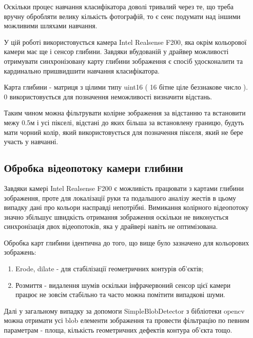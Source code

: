 Оскільки процес навчання класифікатора доволі тривалий через те, що треба вручну обробляти велику кількість фотографій, то є сенс подумати над іншими можливими шляхами навчання.

У цій роботі використовується камера Intel Realsense F200, яка окрім кольорової камери має ще і сенсор глибини. Завдяки вбудованій у драйвер можливості отримувати синхронізовану карту глибини зображення є спосіб удосконалити та кардинально пришвидшити навчання класифікатора.

Карта глибини - матриця з цілими типу uint16 ( 16 бітне ціле беззнакове число ). 0 використовується для позначення неможливості визначити відстань.

Таким чином можна фільтрувати колірне зображення за відстанню та встановити межу 0.5м і усі пікселі, відстані до яких більша за встановлену границю, будуть мати чорний колір, який використовується для позначення пікселя, який не бере участь у навчанні.

\subsection{Обробка відеопотоку камери глибини}
Завдяки камері Intel Realsense F200 є можливість працювати з картами глибини зображення, проте для локалізації руки та подальшого аналізу жестів в цьому випадку дані про кольори насправді непотрібні. Вимикання колірного відеопотоку значно збільшує швидкість отримання зображення оскільки не виконується синхронізація двох відеопотоків, яка у драйвері навіть не оптимізована.

Обробка карт глибини ідентична до того, що вище було зазначено для кольорових зображень:
\begin{enumerate}
	\item Erode, dilate - для стабілізації геометричних контурів об'єктів;
	\item Розмиття - видалення шумів оскільки інфрачервоний сенсор цієї камери працює не зовсім стабільно та часто можна помітити випадкові шуми.
\end{enumerate}

Далі у загальному випадку за допомоги SimpleBlobDetector з бібліотеки opencv можна отримати усі blob елементи зображення та провести фільтрацію по певним параметрам - площа, кількість геометричних дефектів контура об'єкта тощо.
